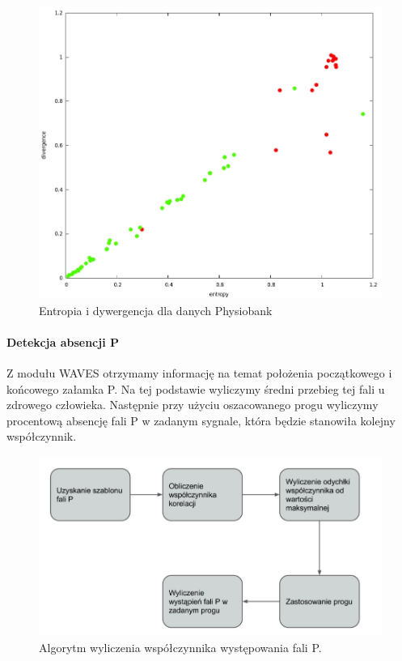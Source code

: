 \begin{figure}[ht]
\centering
\includegraphics[width=12cm]{ATRIAL_FIBR/img/RRResults.jpg}
\caption{Entropia i dywergencja dla danych Physiobank}
\label{fig:RRResults}
\end{figure}

\paragraph{Detekcja absencji P}
Z modułu WAVES otrzymamy informację na temat położenia początkowego i końcowego załamka P. 
Na tej podstawie wyliczymy średni przebieg tej fali u zdrowego człowieka. 
Następnie przy użyciu oszacowanego progu wyliczymy procentową absencję fali P w zadanym sygnale, 
która będzie stanowiła kolejny współczynnik.
\begin{figure}
  \centering
  \includegraphics[width=12cm]{ATRIAL_FIBR/img/PWaveFlow.jpg}
  \caption{Algorytm wyliczenia współczynnika występowania fali P.}
\end{figure}

